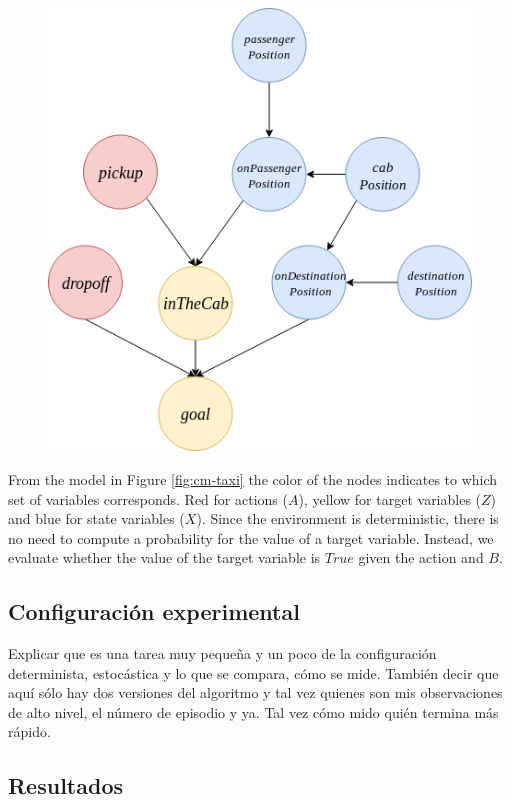 \begin{figure}
    \centering
    \includegraphics[scale=0.3]{Chapter5/Figs/causal_structure_taxi.png}
\end{figure}
From the model in Figure \ref{fig:cm-taxi} the color of the nodes indicates to which set of variables corresponds.
Red for actions ($A$), yellow for target variables ($Z$) and
blue for state variables ($X$). Since the environment 
is deterministic, there is no need to compute a probability 
for the value of a target variable. Instead, we evaluate whether the value of the target variable is $True$ given the action and $B$.


\subsection{Configuración experimental}

Explicar que es una tarea muy pequeña y un poco de la configuración
determinista, estocástica y lo que se compara,
cómo se mide.
También decir que aquí sólo hay dos versiones del algoritmo
y tal vez quienes son mis observaciones de alto nivel, el número
de episodio y ya. Tal vez cómo mido quién termina más rápido.
\subsection{Resultados}

